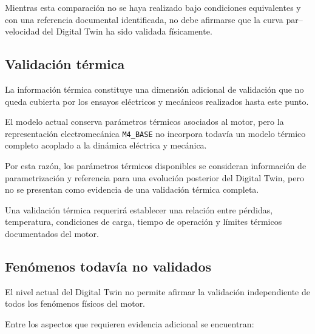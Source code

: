 Mientras esta comparación no se haya realizado bajo condiciones equivalentes y con una referencia documental identificada, no debe afirmarse que la curva par--velocidad del Digital Twin ha sido validada físicamente.

\subsection{Validación térmica}

La información térmica constituye una dimensión adicional de validación que no queda cubierta por los ensayos eléctricos y mecánicos realizados hasta este punto.

El modelo actual conserva parámetros térmicos asociados al motor, pero la representación electromecánica \texttt{M4\_BASE} no incorpora todavía un modelo térmico completo acoplado a la dinámica eléctrica y mecánica.

Por esta razón, los parámetros térmicos disponibles se consideran información de parametrización y referencia para una evolución posterior del Digital Twin, pero no se presentan como evidencia de una validación térmica completa.

Una validación térmica requerirá establecer una relación entre pérdidas, temperatura, condiciones de carga, tiempo de operación y límites térmicos documentados del motor.

\subsection{Fenómenos todavía no validados}

El nivel actual del Digital Twin no permite afirmar la validación independiente de todos los fenómenos físicos del motor.

Entre los aspectos que requieren evidencia adicional se encuentran:


